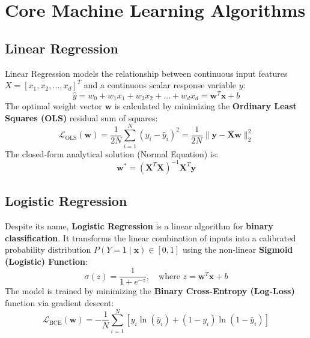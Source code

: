 \section{Core Machine Learning Algorithms}
\label{sec:core_ml_algorithms}

\subsection{Linear Regression}
Linear Regression models the relationship between continuous input features $X = [x_1, x_2, \dots, x_d]^T$ and a continuous scalar response variable $y$:
\begin{equation}
\label{eq:linear_regression}
\hat{y} = w_0 + w_1 x_1 + w_2 x_2 + \dots + w_d x_d = \mathbf{w}^T \mathbf{x} + b
\end{equation}
The optimal weight vector $\mathbf{w}$ is calculated by minimizing the \textbf{Ordinary Least Squares (OLS)} residual sum of squares:
\begin{equation}
\label{eq:ols_loss}
\mathcal{L}_{\text{OLS}}(\mathbf{w}) = \frac{1}{2N} \sum_{i=1}^N (y_i - \hat{y}_i)^2 = \frac{1}{2N} \|\mathbf{y} - \mathbf{X}\mathbf{w}\|_2^2
\end{equation}
The closed-form analytical solution (Normal Equation) is:
\begin{equation}
\label{eq:normal_equation}
\mathbf{w}^* = (\mathbf{X}^T \mathbf{X})^{-1} \mathbf{X}^T \mathbf{y}
\end{equation}

\subsection{Logistic Regression}
Despite its name, \textbf{Logistic Regression} is a linear algorithm for \textbf{binary classification}. It transforms the linear combination of inputs into a calibrated probability distribution $P(Y=1 \mid \mathbf{x}) \in [0, 1]$ using the non-linear \textbf{Sigmoid (Logistic) Function}:
\begin{equation}
\label{eq:sigmoid_function}
\sigma(z) = \frac{1}{1 + e^{-z}}, \quad \text{where } z = \mathbf{w}^T \mathbf{x} + b
\end{equation}
The model is trained by minimizing the \textbf{Binary Cross-Entropy (Log-Loss)} function via gradient descent:
\begin{equation}
\label{eq:binary_cross_entropy}
\mathcal{L}_{\text{BCE}}(\mathbf{w}) = -\frac{1}{N} \sum_{i=1}^N \left[ y_i \ln(\hat{y}_i) + (1 - y_i) \ln(1 - \hat{y}_i) \right]
\end{equation}

